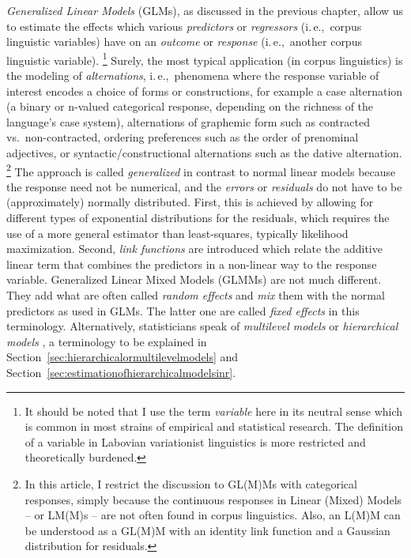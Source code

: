\documentclass[a4paper,12pt]{article}
\newcommand{\ie}{i.\,e.,\ }
\begin{document}
\textit{Generalized Linear Models} (GLMs), as discussed in the previous chapter, allow us to estimate the effects which various \textit{predictors} or \textit{regressors} (\ie corpus linguistic variables) have on an \textit{outcome} or \textit{response} (\ie another corpus linguistic variable).%
\footnote{It should be noted that I use the term \textit{variable} here in its neutral sense which is common in most strains of empirical and statistical research.
The definition of a variable in Labovian variationist linguistics is more restricted and theoretically burdened.}
Surely, the most typical application (in corpus linguistics) is the modeling of \textit{alternations}, \ie phenomena where the response variable of interest encodes a choice of forms or constructions, for example a case alternation (a binary or n-valued categorical response, depending on the richness of the language's case system), alternations of graphemic form such as contracted vs.\ non-contracted, ordering preferences such as the order of prenominal adjectives, or syntactic\slash constructional alternations such as the dative alternation.%
\footnote{In this article, I restrict the discussion to GL(M)Ms with categorical responses, simply because the continuous responses in Linear (Mixed) Models -- or LM(M)s – are not often found in corpus linguistics.
Also, an L(M)M can be understood as a GL(M)M with an identity link function and a Gaussian distribution for residuals.}
The approach is called \textit{generalized} in contrast to normal linear models because the response need not be numerical, and the \textit{errors} or \textit{residuals} do not have to be (approximately) normally distributed.
First, this is achieved by allowing for different types of exponential distributions for the residuals, which requires the use of a more general estimator than least-squares, typically likelihood maximization.
Second, \textit{link functions} are introduced which relate the additive linear term that combines the predictors in a non-linear way to the response variable.
Generalized Linear Mixed Models (GLMMs) are not much different.
They add what are often called \textit{random effects} and \textit{mix} them with the normal predictors as used in GLMs.
The latter one are called \textit{fixed effects} in this terminology.
Alternatively, statisticians speak of \textit{multilevel models} or \textit{hierarchical models} \citep{GelmanHill2006}, a terminology to be explained in Section~\ref{sec:hierarchicalormultilevelmodels} and Section~\ref{sec:estimationofhierarchicalmodelsinr}.
\end{document}
